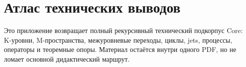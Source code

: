 \section{Атлас технических выводов}
\label{sec:oc-core-1-3-technical-derivation-atlas}

Это приложение возвращает полный рекурсивный технический подкорпус Core:
K-уровни, M-пространства, межуровневые переходы, циклы, jets, процессы,
операторы и теоремные опоры. Материал остаётся внутри одного PDF, но не
ломает основной дидактический маршрут.

\begingroup
\let\ocappendixsection\section
\let\ocappendixsubsection\subsection
\let\ocappendixsubsubsection\subsubsection
\renewcommand{\section}{\ocappendixsubsection}
\renewcommand{\subsection}{\ocappendixsubsubsection}
\scriptsize
\RaggedRight
\sloppy

\endgroup
